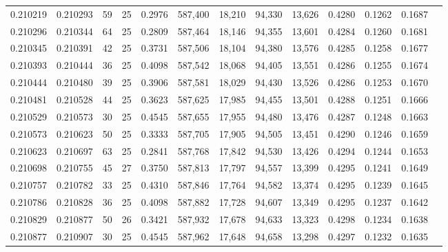 \begin{tabular}{rrrrrrrrrrrrr}
0.210219 & 0.210293 &  59 &  25 &                                     0.2976 & 587,400 &  18,210 &  94,330 &  13,626 & 0.4280 & 0.1262 & 0.1687 \\
0.210296 & 0.210344 &  64 &  25 &                                     0.2809 & 587,464 &  18,146 &  94,355 &  13,601 & 0.4284 & 0.1260 & 0.1681 \\
0.210345 & 0.210391 &  42 &  25 &                                     0.3731 & 587,506 &  18,104 &  94,380 &  13,576 & 0.4285 & 0.1258 & 0.1677 \\
0.210393 & 0.210444 &  36 &  25 &                                     0.4098 & 587,542 &  18,068 &  94,405 &  13,551 & 0.4286 & 0.1255 & 0.1674 \\
0.210444 & 0.210480 &  39 &  25 &                                     0.3906 & 587,581 &  18,029 &  94,430 &  13,526 & 0.4286 & 0.1253 & 0.1670 \\
0.210481 & 0.210528 &  44 &  25 &                                     0.3623 & 587,625 &  17,985 &  94,455 &  13,501 & 0.4288 & 0.1251 & 0.1666 \\
0.210529 & 0.210573 &  30 &  25 &                                     0.4545 & 587,655 &  17,955 &  94,480 &  13,476 & 0.4287 & 0.1248 & 0.1663 \\
0.210573 & 0.210623 &  50 &  25 &                                     0.3333 & 587,705 &  17,905 &  94,505 &  13,451 & 0.4290 & 0.1246 & 0.1659 \\
0.210623 & 0.210697 &  63 &  25 &                                     0.2841 & 587,768 &  17,842 &  94,530 &  13,426 & 0.4294 & 0.1244 & 0.1653 \\
0.210698 & 0.210755 &  45 &  27 &                                     0.3750 & 587,813 &  17,797 &  94,557 &  13,399 & 0.4295 & 0.1241 & 0.1649 \\
0.210757 & 0.210782 &  33 &  25 &                                     0.4310 & 587,846 &  17,764 &  94,582 &  13,374 & 0.4295 & 0.1239 & 0.1645 \\
0.210786 & 0.210828 &  36 &  25 &                                     0.4098 & 587,882 &  17,728 &  94,607 &  13,349 & 0.4295 & 0.1237 & 0.1642 \\
0.210829 & 0.210877 &  50 &  26 &                                     0.3421 & 587,932 &  17,678 &  94,633 &  13,323 & 0.4298 & 0.1234 & 0.1638 \\
0.210877 & 0.210907 &  30 &  25 &                                     0.4545 & 587,962 &  17,648 &  94,658 &  13,298 & 0.4297 & 0.1232 & 0.1635 \\

\end{tabular}
